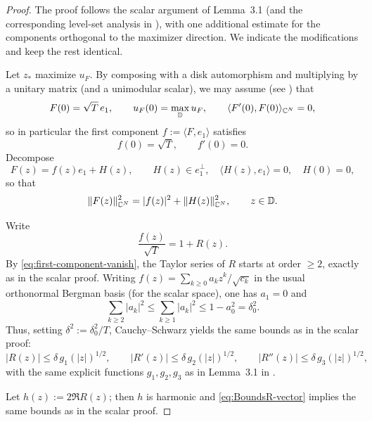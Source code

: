 \documentclass[a4paper,10pt]{amsart}
\newcommand{\D}{\mathbb{D}}
\begin{document}
\begin{proof}
The proof follows the scalar argument of Lemma~3.1 \cite{GomezKalajMelentijevicRamos2025}
(and the corresponding level-set analysis in \cite{GomezKalajMelentijevicRamos2025}),
with one additional estimate for the components orthogonal to the maximizer direction.
We indicate the modifications and keep the rest identical.

Let $z_\ast$ maximize $u_F$. By composing with a disk automorphism and multiplying by a unitary matrix
(and a unimodular scalar), we may assume (see \cite[Lemma~3.1]{GomezKalajMelentijevicRamos2025}) that
\[
F(0)=\sqrt{T}\,e_1,\qquad u_F(0)=\max_\D u_F,\qquad \langle F'(0),F(0)\rangle_{\C^N}=0,
\]
so in particular the first component $f:=\langle F,e_1\rangle$ satisfies
\begin{equation}\label{eq:first-component-vanish}
f(0)=\sqrt{T},\qquad f'(0)=0.
\end{equation}
Decompose
\[
F(z)= f(z)e_1 + H(z),\qquad H(z)\in e_1^\perp,\quad \langle H(z),e_1\rangle=0,\quad H(0)=0,
\]
so that
\begin{equation}\label{eq:decomp-norm}
\|F(z)\|_{\C^N}^2 = |f(z)|^2 + \|H(z)\|_{\C^N}^2,\qquad z\in\D.
\end{equation}

Write
\[
\frac{f(z)}{\sqrt{T}} = 1+R(z).
\]
By \eqref{eq:first-component-vanish}, the Taylor series of $R$ starts at order $\ge2$,
exactly as in the scalar proof. Writing $f(z)=\sum_{k\ge 0} a_k z^k/\sqrt{c_k}$
in the usual orthonormal Bergman basis (for the scalar space),
one has $a_1=0$ and
\[
\sum_{k\ge2}|a_k|^2 \le \sum_{k\ge1}|a_k|^2 \le 1-a_0^2=\delta_0^2.
\]
Thus, setting $\delta^2:=\delta_0^2/T$, Cauchy--Schwarz yields the same bounds as in the scalar proof:
\begin{equation}\label{eq:BoundsR-vector}
|R(z)|\le \delta\, g_1(|z|)^{1/2},\qquad
|R'(z)|\le \delta\, g_2(|z|)^{1/2},\qquad
|R''(z)|\le \delta\, g_3(|z|)^{1/2},
\end{equation}
with the same explicit functions $g_1,g_2,g_3$ as in Lemma~3.1 in \cite{GomezKalajMelentijevicRamos2025}.

Let $h(z):=2\Re R(z)$; then $h$ is harmonic and \eqref{eq:BoundsR-vector} implies
the same bounds as \cite[eq.~3.4]{GomezKalajMelentijevicRamos2025} in the scalar proof.


\end{proof}
\end{document}
